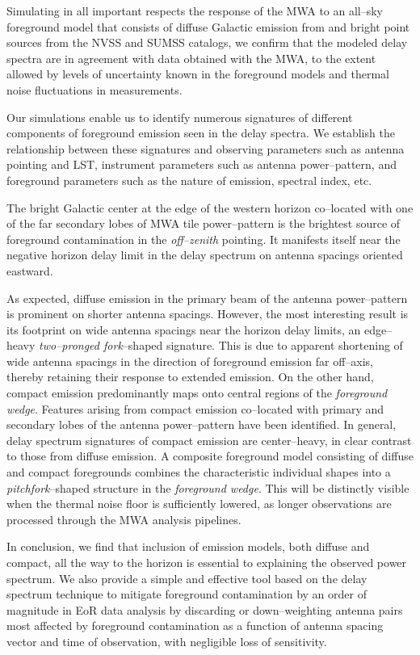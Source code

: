 \documentclass[preprint2,iop,numberedappendix]{emulateapj}
\begin{document}
Simulating in all important respects the response of the MWA to an all--sky foreground model that consists of diffuse Galactic emission from \citet{deo08} and bright point sources from the NVSS and SUMSS catalogs, we confirm that the modeled delay spectra are in agreement with data obtained with the MWA, to the extent allowed by levels of uncertainty known in the foreground models and thermal noise fluctuations in measurements. 

Our simulations enable us to identify numerous signatures of different components of foreground emission seen in the delay spectra. We establish the relationship between these signatures and observing parameters such as antenna pointing and LST, instrument parameters such as antenna power--pattern, and foreground parameters such as the nature of emission, spectral index, etc. 

The bright Galactic center at the edge of the western horizon co--located with one of the far secondary lobes of MWA tile power--pattern is the brightest source of foreground contamination in the {\it off--zenith} pointing. It manifests itself near the negative horizon delay limit in the delay spectrum on antenna spacings oriented eastward. 

As expected, diffuse emission in the primary beam of the antenna power--pattern is prominent on shorter antenna spacings. However, the most interesting result is its footprint on wide antenna spacings near the horizon delay limits, an edge--heavy {\it two--pronged fork}--shaped signature. This is due to apparent shortening of wide antenna spacings in the direction of foreground emission far off--axis, thereby retaining their response to extended emission. On the other hand, compact emission predominantly maps onto central regions of the {\it foreground wedge}. Features arising from compact emission co--located with primary and secondary lobes of the antenna power--pattern have been identified. In general, delay spectrum signatures of compact emission are center--heavy, in clear contrast to those from diffuse emission. A composite foreground model consisting of diffuse and compact foregrounds combines the characteristic individual shapes into a {\it pitchfork}--shaped structure in the {\it foreground wedge}. This will be distinctly visible when the thermal noise floor is sufficiently lowered, as longer observations are processed through the MWA analysis pipelines.

In conclusion, we find that inclusion of emission models, both diffuse and compact, all the way to the horizon is essential to explaining the observed power spectrum. We also provide a simple and effective tool based on the delay spectrum technique to mitigate foreground contamination by an order of magnitude in EoR data analysis by discarding or down--weighting antenna pairs most affected by foreground contamination as a function of antenna spacing vector and time of observation, with negligible loss of sensitivity.
\end{document}
